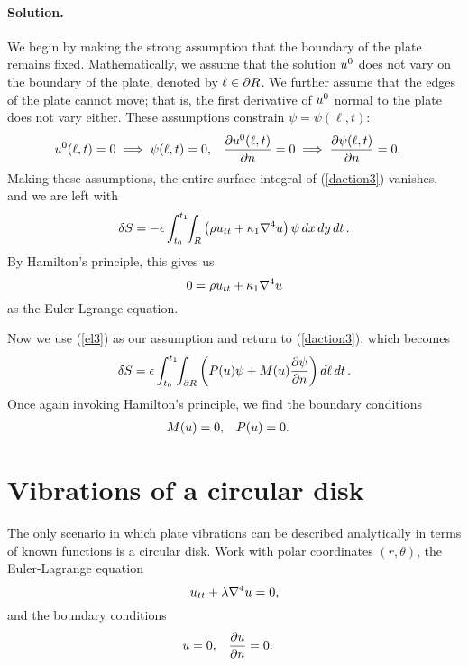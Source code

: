 \documentclass[11pt]{article}
\newcommand{\refeq}[1]{(\ref{#1})}
\newcommand{\beq}{\begin{equation*}}
\newcommand{\eeq}{\end{equation*}}
\newcommand{\beqn}{\begin{equation}}
\newcommand{\eeqn}{\end{equation}}
\newenvironment{statement}
{
    \color{darkgray}
    \ignorespaces
}
{
}
\newenvironment{solution}
{
    \paragraph{Solution.}
    \ignorespaces
}
{
}
\begin{document}
\begin{solution}
	We begin by making the strong assumption that the boundary of the plate remains fixed.  Mathematically, we assume that the solution $u^0$ does not vary on the boundary of the plate, denoted by $\ell \in \partial R$.  We further assume that the edges of the plate cannot move; that is, the first derivative of $u^0$ normal to the plate does not vary either.  These assumptions constrain $\psi = \psi(\ell, t)$:
	\begin{align*}
		u^0(\ell, t) = 0 &\implies \psi(\ell, t) = 0, &
		\pdv{u^0(\ell, t)}{n} = 0 &\implies \pdv{\psi(\ell, t)}{n} = 0.
	\end{align*}
	Making these assumptions, the entire surface integral of \refeq{daction3} vanishes, and we are left with
	\beq
		\dS = -\eps \inttr \left(\rho \utt + \kaq \lapw u \right) \psi \drt.
	\eeq
	By Hamilton's principle, this gives us
	\beq \label{el3}
		0 = \rho \utt + \kaq \lapw u
	\eeq
	as the Euler-Lgrange equation.
	
	Now we use \refeq{el3} as our assumption and return to \refeq{daction3}, which becomes
	\beq
		\dS = \eps \inttdr \left( \Pu \psi + \Mu \pdv{\psi}{n} \right) \dlt.
	\eeq
	Once again invoking Hamilton's principle, we find the boundary conditions
	\begin{align}
		M(u) &= 0, & P(u) &= 0.
	\end{align}
\end{solution}


\newcommand{\lam}{\lambda}
\newcommand{\vrt}{v(r, \theta)}
\newcommand{\gt}{g(t)}
\newcommand{\fnr}{f_n(r)}

\section{Vibrations of a circular disk}

\begin{statement}
	The only scenario in which plate vibrations can be described analytically in terms of known functions is a circular disk.  Work with polar coordinates $(r, \theta)$, the Euler-Lagrange equation
	\beqn \label{el4}
		\utt + \lam \lapw u = 0,
	\eeqn
	and the boundary conditions
	\begin{align} \label{bc4}
		u &= 0, & \pdv{u}{n} &= 0.
	\end{align}
\end{statement}


\newcommand{\Cq}{C_1}
\newcommand{\Cw}{C_2}

\newcommand{\Dq}{D_1}
\newcommand{\Dw}{D_2}
\end{document}

